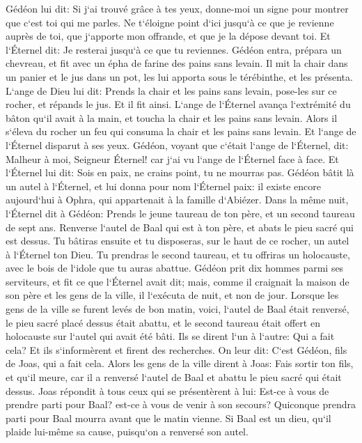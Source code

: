 \verse Gédéon lui dit: Si j`ai trouvé grâce à tes yeux, donne-moi un signe pour montrer que c`est toi qui me parles. 
\verse Ne t`éloigne point d`ici jusqu`à ce que je revienne auprès de toi, que j`apporte mon offrande, et que je la dépose devant toi. Et l`Éternel dit: Je resterai jusqu`à ce que tu reviennes. 
\verse Gédéon entra, prépara un chevreau, et fit avec un épha de farine des pains sans levain. Il mit la chair dans un panier et le jus dans un pot, les lui apporta sous le térébinthe, et les présenta. 
\verse L`ange de Dieu lui dit: Prends la chair et les pains sans levain, pose-les sur ce rocher, et répands le jus. Et il fit ainsi. 
\verse L`ange de l`Éternel avança l`extrémité du bâton qu`il avait à la main, et toucha la chair et les pains sans levain. Alors il s`éleva du rocher un feu qui consuma la chair et les pains sans levain. Et l`ange de l`Éternel disparut à ses yeux. 
\verse Gédéon, voyant que c`était l`ange de l`Éternel, dit: Malheur à moi, Seigneur Éternel! car j`ai vu l`ange de l`Éternel face à face. 
\verse Et l`Éternel lui dit: Sois en paix, ne crains point, tu ne mourras pas. 
\verse Gédéon bâtit là un autel à l`Éternel, et lui donna pour nom l`Éternel paix: il existe encore aujourd`hui à Ophra, qui appartenait à la famille d`Abiézer. 
\verse Dans la même nuit, l`Éternel dit à Gédéon: Prends le jeune taureau de ton père, et un second taureau de sept ans. Renverse l`autel de Baal qui est à ton père, et abats le pieu sacré qui est dessus. 
\verse Tu bâtiras ensuite et tu disposeras, sur le haut de ce rocher, un autel à l`Éternel ton Dieu. Tu prendras le second taureau, et tu offriras un holocauste, avec le bois de l`idole que tu auras abattue. 
\verse Gédéon prit dix hommes parmi ses serviteurs, et fit ce que l`Éternel avait dit; mais, comme il craignait la maison de son père et les gens de la ville, il l`exécuta de nuit, et non de jour. 
\verse Lorsque les gens de la ville se furent levés de bon matin, voici, l`autel de Baal était renversé, le pieu sacré placé dessus était abattu, et le second taureau était offert en holocauste sur l`autel qui avait été bâti. 
\verse Ils se dirent l`un à l`autre: Qui a fait cela? Et ils s`informèrent et firent des recherches. On leur dit: C`est Gédéon, fils de Joas, qui a fait cela. 
\verse Alors les gens de la ville dirent à Joas: Fais sortir ton fils, et qu`il meure, car il a renversé l`autel de Baal et abattu le pieu sacré qui était dessus. 
\verse Joas répondit à tous ceux qui se présentèrent à lui: Est-ce à vous de prendre parti pour Baal? est-ce à vous de venir à son secours? Quiconque prendra parti pour Baal mourra avant que le matin vienne. Si Baal est un dieu, qu`il plaide lui-même sa cause, puisqu`on a renversé son autel. 
